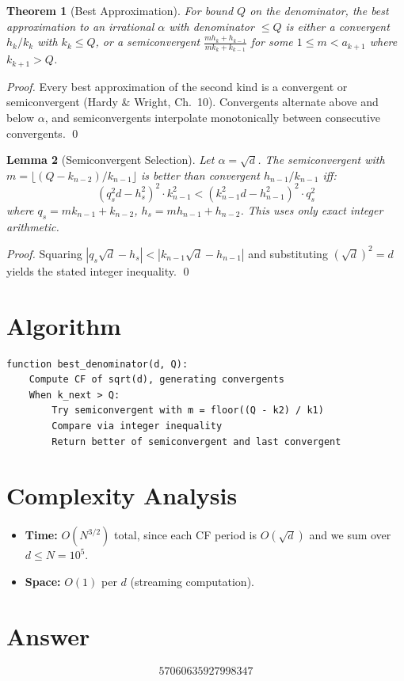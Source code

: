 \documentclass[12pt]{article}
\newtheorem{theorem}{Theorem}
\newtheorem{lemma}[theorem]{Lemma}
\begin{document}
\begin{theorem}[Best Approximation]
For bound $Q$ on the denominator, the best approximation to an irrational $\alpha$ with denominator $\leq Q$ is either a convergent $h_k/k_k$ with $k_k \leq Q$, or a semiconvergent $\frac{m h_k + h_{k-1}}{m k_k + k_{k-1}}$ for some $1 \leq m < a_{k+1}$ where $k_{k+1} > Q$.
\end{theorem}

\begin{proof}
Every best approximation of the second kind is a convergent or semiconvergent (Hardy \& Wright, Ch.~10). Convergents alternate above and below $\alpha$, and semiconvergents interpolate monotonically between consecutive convergents. \qed
\end{proof}

\begin{lemma}[Semiconvergent Selection]
Let $\alpha = \sqrt{d}$. The semiconvergent with $m = \lfloor(Q - k_{n-2})/k_{n-1}\rfloor$ is better than convergent $h_{n-1}/k_{n-1}$ iff:
\[
(q_s^2 d - h_s^2)^2 \cdot k_{n-1}^2 < (k_{n-1}^2 d - h_{n-1}^2)^2 \cdot q_s^2
\]
where $q_s = m k_{n-1} + k_{n-2}$, $h_s = m h_{n-1} + h_{n-2}$. This uses only exact integer arithmetic.
\end{lemma}

\begin{proof}
Squaring $|q_s \sqrt{d} - h_s| < |k_{n-1}\sqrt{d} - h_{n-1}|$ and substituting $(\sqrt{d})^2 = d$ yields the stated integer inequality. \qed
\end{proof}

\section{Algorithm}

\begin{verbatim}
function best_denominator(d, Q):
    Compute CF of sqrt(d), generating convergents
    When k_next > Q:
        Try semiconvergent with m = floor((Q - k2) / k1)
        Compare via integer inequality
        Return better of semiconvergent and last convergent
\end{verbatim}

\section{Complexity Analysis}

\begin{itemize}
    \item \textbf{Time:} $O(N^{3/2})$ total, since each CF period is $O(\sqrt{d})$ and we sum over $d \leq N = 10^5$.
    \item \textbf{Space:} $O(1)$ per $d$ (streaming computation).
\end{itemize}

\section{Answer}

\[
\boxed{57060635927998347}
\]
\end{document}
